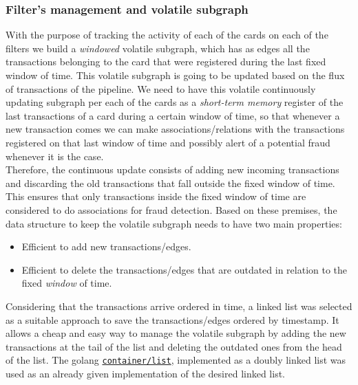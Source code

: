 \begin{graysection}
\subsubsection{Filter's management and volatile subgraph}


With the purpose of tracking the activity of each of the cards on each of the filters we build a \textit{windowed} volatile subgraph, which has as edges all the transactions belonging to the card that were registered during the last fixed window of time. This volatile subgraph is going to be updated based on the flux of transactions of the pipeline. We need to have this volatile continuously updating subgraph per each of the cards as a \textit{short-term memory} register of the last transactions of a card during a certain window of time, so that whenever a new transaction comes we can make associations/relations with the transactions registered on that last window of time and possibly alert of a potential fraud whenever it is the case.\\
Therefore, the continuous update consists of adding new incoming transactions and discarding the old transactions that fall outside the fixed window of time. This ensures that only transactions inside the fixed window of time are considered to do associations for fraud detection. 
Based on these premises, the data structure to keep the volatile subgraph needs to have two main properties:
\begin{itemize}
    \item Efficient to add new transactions/edges.
    \item Efficient to delete the transactions/edges that are outdated in relation to the fixed \textit{window} of time.
\end{itemize}

Considering that the transactions arrive ordered in time, a linked list was selected as a suitable approach to save the transactions/edges ordered by timestamp. It allows a cheap and easy way to manage the volatile subgraph by adding the new transactions at the tail of the list and deleting the outdated ones from the head of the list. The golang \href{https://pkg.go.dev/container/list}{\texttt{container/list}}, implemented as a doubly linked list was used as an already given implementation of the desired linked list.


\end{graysection}
